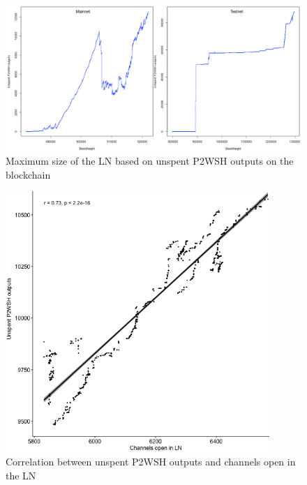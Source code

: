 \begin{figure}[ht]
    \centering
    \includegraphics[width=15cm]{figures/graphs/ln_size_bc.png}
    \caption{Maximum size of the LN based on unspent P2WSH outputs on the blockchain}
    \label{fig:ln_size}
\end{figure}

\begin{figure}[ht]
    \centering
    \includegraphics[width=10cm]{figures/graphs/channel_p2wsh_correlation_mainnnet.png}
    \caption{Correlation between unspent P2WSH outputs and channels open in the LN}
    \label{fig:correlation}
\end{figure}

